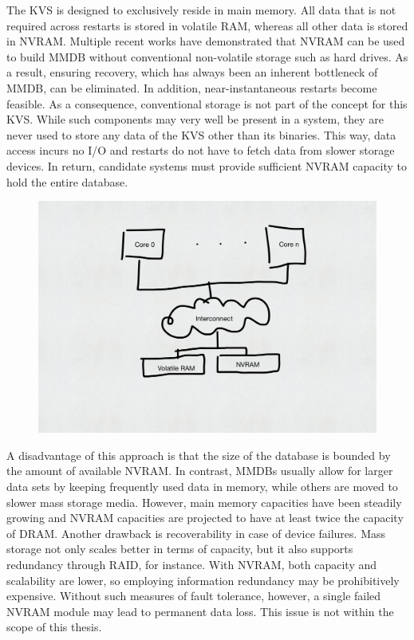 The \ac{KVS} is designed to exclusively reside in main memory. All data that is
not required across restarts is stored in volatile \ac{RAM}, whereas all other
data is stored in \ac{NVRAM}. Multiple recent works have demonstrated that
\ac{NVRAM} can be used to build \ac{MMDB} without conventional non-volatile
storage such as hard drives. As a result, ensuring recovery, which has always
been an inherent bottleneck of \ac{MMDB}, can be eliminated. In addition,
near-instantaneous restarts become feasible. As a consequence, conventional
storage is not part of the concept for this \ac{KVS}. While such components may
very well be present in a system, they are never used to store any data of the
\ac{KVS} other than its binaries. This way, data access incurs no I/O and
restarts do not have to fetch data from slower storage devices. In return,
candidate systems must provide sufficient \ac{NVRAM} capacity to hold the entire
database.

\begin{figure}[h!]
    \centering
    \includegraphics[scale=0.5]{figures/drafts/concept-sys-mem.pdf}
    \caption{}
    \label{fig:concept-sys-mem}
\end{figure}

A disadvantage of this approach is that the size of the database is bounded by
the amount of available \ac{NVRAM}. In contrast, \acp{MMDB} usually allow for
larger data sets by keeping frequently used data in memory, while others are
moved to slower mass storage media. However, main memory capacities have been
steadily growing and \ac{NVRAM} capacities are projected to have at least twice
the capacity of \ac{DRAM}. Another drawback is recoverability in case of device
failures. Mass storage not only scales better in terms of capacity, but it also
supports redundancy through \ac{RAID}, for instance. With \ac{NVRAM}, both
capacity and scalability are lower, so employing information redundancy may be
prohibitively expensive. Without such measures of fault tolerance, however, a
single failed \ac{NVRAM} module may lead to permanent data loss. This issue is
not within the scope of this thesis.
